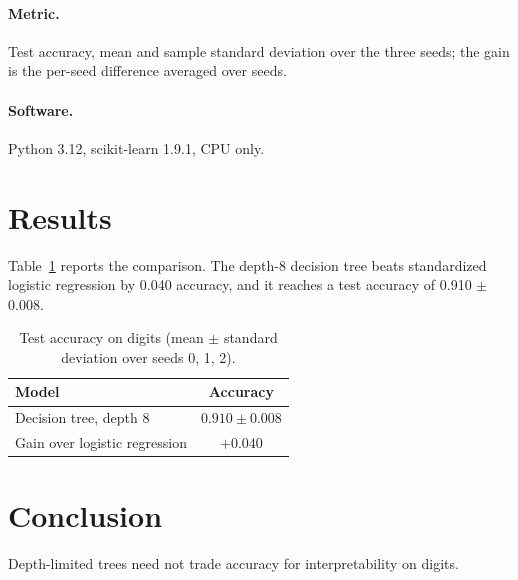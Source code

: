 \documentclass[11pt]{article}
\begin{document}
\paragraph{Metric.} Test accuracy, mean and sample standard deviation over the three seeds; the
gain is the per-seed difference averaged over seeds.
\paragraph{Software.} Python 3.12, scikit-learn 1.9.1, CPU only.

\section{Results}
Table~\ref{tab:digits-tree} reports the comparison. The depth-8 decision tree beats
standardized logistic regression by 0.040 accuracy, and it reaches a test accuracy of
0.910 $\pm$ 0.008.

\begin{table}[t]
\centering
\caption{Test accuracy on digits (mean $\pm$ standard deviation over seeds 0, 1, 2).}
\label{tab:digits-tree}
\begin{tabular}{lc}
\toprule
Model & Accuracy \\
\midrule
Decision tree, depth 8 & $0.910 \pm 0.008$ \\
\midrule
Gain over logistic regression & $+0.040$ \\
\bottomrule
\end{tabular}
\end{table}

\section{Conclusion}
Depth-limited trees need not trade accuracy for interpretability on digits.
\end{document}
